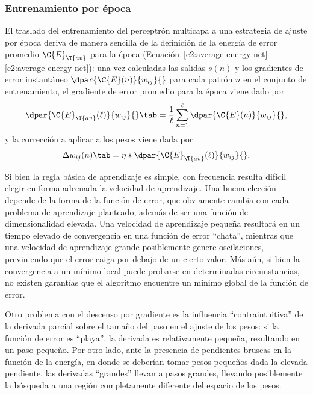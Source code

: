 \subsubsection{Entrenamiento por época}
%
El traslado del entrenamiento del perceptrón multicapa a una estrategia
de ajuste por época deriva de manera sencilla de la definición de
la energía de error promedio $\C{E}_{\T{av}}$ para la época 
(\iflatexml{}Ecuación~\ref{e2:average-energy-net}\else\autoref{e2:average-energy-net}\fi):
una vez calculadas las salidas $s(n)$ y los gradientes de error instantáneo
$\dpar{\C{E}(n)}{w_{ij}}{}$ para cada patrón $n$ en el conjunto de entrenamiento,
el gradiente de error promedio para la época viene dado por
%
\begin{align}
  \dpar{\C{E}_{\T{av}}(\ell)}{w_{ij}}{}\tab=\frac{1}{\ell}\sum_{n=1}^\ell\dpar{\C{E}(n)}{w_{ij}}{},
\end{align}
%
y la corrección a aplicar a los pesos viene dada por
%
\begin{align}\label{e2:delta-rule}
  \Delta w_{ij}(n)\tab=\eta *\dpar{\C{E}_{\T{av}}(\ell)}{w_{ij}}{}.
\end{align}
%

















%
Si bien la regla básica de aprendizaje es simple, con frecuencia
resulta difícil elegir en forma adecuada la velocidad de
aprendizaje. Una buena elección depende de la forma de la función de
error, que obviamente cambia con cada problema de aprendizaje
planteado, además de ser una función de dimensionalidad elevada.  Una
velocidad de aprendizaje pequeña resultará en un tiempo elevado de
convergencia en una función de error ``chata'', mientras que una velocidad
de aprendizaje grande posiblemente genere oscilaciones, previniendo
que el error caiga por debajo de un cierto valor.  Más aún, si bien la
convergencia a un mínimo local puede probarse en determinadas
circunstancias, no existen garantías que el algoritmo encuentre un
mínimo global de la función de error.

Otro problema con el descenso por gradiente es la influencia
``contraintuitiva'' de la derivada parcial sobre el tamaño del paso en
el ajuste de los pesos: si la función de error es ``playa'', la
derivada es relativamente pequeña, resultando en un paso pequeño.  Por
otro lado, ante la presencia de pendientes bruscas en la función de
la energía, en donde se deberían tomar pesos pequeños dada la
elevada pendiente, las derivadas ``grandes'' llevan a pasos grandes,
llevando posiblemente la búsqueda a una región completamente diferente
del espacio de los pesos.
%
